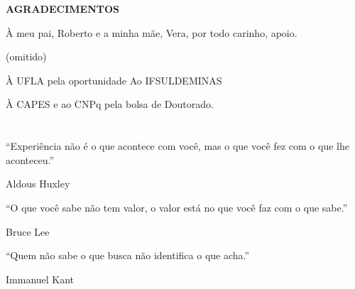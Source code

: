 \newpage\null\thispagestyle{empty}\newpage


\newpage
\begin{center}
\textbf{AGRADECIMENTOS}
\end{center}
\vspace{0.5cm}

À meu pai, Roberto e a minha mãe, Vera, por todo carinho, 
apoio.

(omitido)

À UFLA pela oportunidade 
Ao IFSULDEMINAS

À CAPES e ao CNPq pela bolsa de Doutorado.


\newpage
\section*{}
\vspace{8cm}

\setlength{\epigraphrule}{0pt}
\epigraph{
``Experiência não é o que acontece com você, mas o que você fez com o que lhe 
aconteceu.''}{Aldous Huxley}

\setlength{\epigraphrule}{0pt}
\epigraph{
``O que você sabe não tem valor, o valor está no que você faz com o
que sabe.''}{Bruce Lee}
 
\setlength{\epigraphrule}{0pt}
\epigraph{
``Quem não sabe o que busca não identifica o que acha.''}{Immanuel Kant}

\newpage\null\thispagestyle{empty}\newpage

